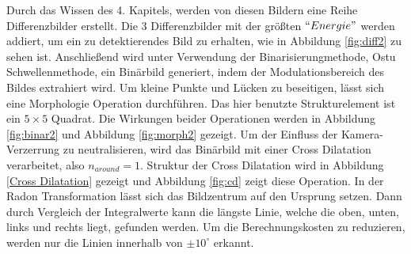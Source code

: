 Durch das Wissen des 4. Kapitels, werden von diesen Bildern eine Reihe Differenzbilder erstellt. Die 3 Differenzbilder mit der größten $``Energie"$ werden addiert, um ein zu detektierendes Bild zu erhalten, wie in Abbildung \ref{fig:diff2} zu sehen ist. Anschließend wird unter Verwendung der Binarisierungmethode, Ostu Schwellenmethode, ein Binärbild generiert, indem der Modulationsbereich des Bildes extrahiert wird. Um kleine Punkte und Lücken zu beseitigen, lässt sich eine Morphologie Operation durchführen. Das hier benutzte Strukturelement ist ein $5 \times 5$ Quadrat. Die Wirkungen beider Operationen werden in Abbildung \ref{fig:binar2} und Abbildung \ref{fig:morph2} gezeigt. Um der Einfluss der Kamera-Verzerrung zu neutralisieren, wird das Binärbild mit einer Cross Dilatation verarbeitet, also $ n_{around} = 1$. Struktur der Cross Dilatation wird in Abbildung \ref{Cross Dilatation} gezeigt und Abbildung \ref{fig:cd} zeigt diese Operation. In der Radon Transformation lässt sich das Bildzentrum auf den Ursprung setzen. Dann durch Vergleich der Integralwerte kann die längste Linie, welche die oben, unten, links und rechts liegt, gefunden werden. Um die Berechnungskosten zu reduzieren, werden nur die Linien innerhalb von $ \pm 10^{\circ} $ erkannt. 
